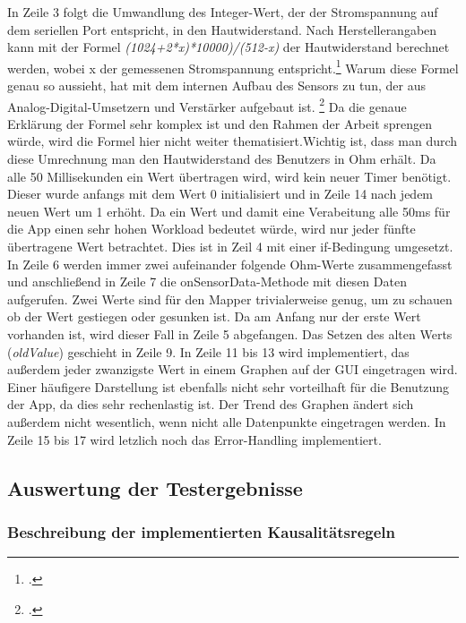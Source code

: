 In Zeile 3 folgt die Umwandlung des Integer-Wert, der der Stromspannung auf dem seriellen Port entspricht, in den Hautwiderstand. \newline Nach Herstellerangaben kann mit der Formel \textit{(1024+2*x)*10000)/(512-x)} der Hautwiderstand berechnet werden, wobei x der gemessenen Stromspannung entspricht.\footcite[Vgl.][]{Gro18} Warum diese Formel genau so aussieht, hat mit dem internen Aufbau des Sensors zu tun, der aus Analog-Digital-Umsetzern und Verstärker aufgebaut ist. \footcite[Vgl.][1. Forumsantwort]{Com18} Da die genaue Erklärung der Formel sehr komplex ist und den Rahmen der Arbeit sprengen würde, wird die Formel hier nicht weiter thematisiert.Wichtig ist, dass man durch diese Umrechnung man den Hautwiderstand des Benutzers in Ohm erhält. \newline
Da alle 50 Millisekunden ein Wert übertragen wird, wird kein neuer Timer benötigt. Dieser wurde anfangs mit dem Wert 0 initialisiert und in Zeile 14 nach jedem neuen Wert um 1 erhöht. Da ein Wert und damit eine Verabeitung alle 50ms für die App einen sehr hohen Workload bedeutet würde, wird nur jeder fünfte übertragene Wert betrachtet. Dies ist in Zeil 4 mit einer if-Bedingung umgesetzt. In Zeile 6 werden immer zwei aufeinander folgende Ohm-Werte zusammengefasst und anschließend in Zeile 7 die onSensorData-Methode mit diesen Daten aufgerufen. Zwei Werte sind für den Mapper trivialerweise genug, um zu schauen ob der Wert gestiegen oder gesunken ist. Da am Anfang nur der erste Wert vorhanden ist, wird dieser Fall in Zeile 5 abgefangen. Das Setzen des alten Werts (\textit{oldValue}) geschieht in Zeile 9. \newline
In Zeile 11 bis 13 wird implementiert, das außerdem jeder zwanzigste Wert in einem Graphen auf der GUI eingetragen wird. Einer häufigere Darstellung ist ebenfalls nicht sehr vorteilhaft für die Benutzung der App, da dies sehr rechenlastig ist. Der Trend des Graphen ändert sich außerdem nicht wesentlich, wenn nicht alle Datenpunkte eingetragen werden. \newline
In Zeile 15 bis 17 wird letzlich noch das Error-Handling implementiert.
\subsection{Auswertung der Testergebnisse}
\subsubsection{Beschreibung der implementierten Kausalitätsregeln}
